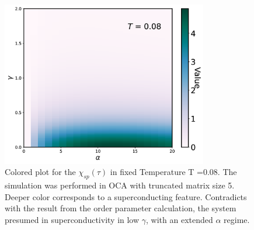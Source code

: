 \documentclass{article}[12pt]
\numberwithin{equation}{section}
\begin{document}
\begin{spacing}{1.5}
\begin{figure}[H]
\vfill
\end{figure}
\pagebreak
\newpage
\begin{figure}[H]
  \centerline{\includegraphics[width=9cm]{TexFigure/4/4_4_05_oc_colormap.png}}
  \caption{Colored plot for the $\chi_{sp}(\tau)$ in fixed Temperature T =0.08. The simulation was performed in OCA with truncated matrix size 5. Deeper color corresponds to a superconducting feature. Contradicts with the result from the order parameter calculation, the system presumed in superconductivity in low $\gamma$, with an extended $\alpha$ regime.}
 \end{figure}
\end{spacing}
\end{document}
